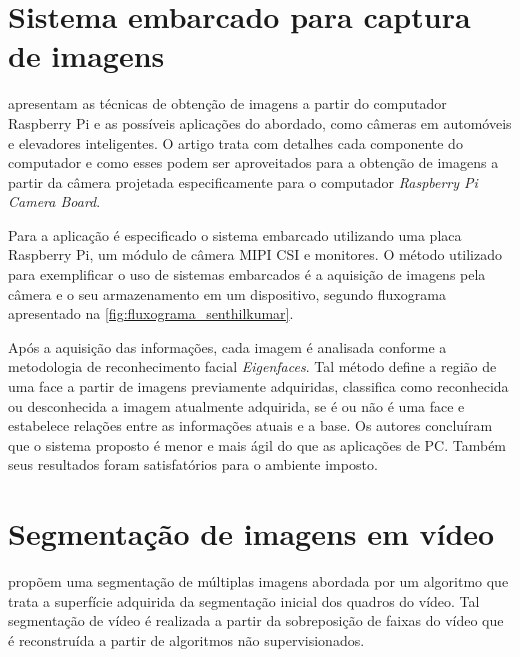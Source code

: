 \documentclass[12pt,oneside,a4paper,chapter=TITLE,section=TITLE,sumario=tradicional]{abntex2}
\begin{document}
\begin{figure}[htb]
\end{figure}

\section{Sistema embarcado para captura de imagens}

 apresentam as técnicas de obtenção de imagens a partir do computador Raspberry Pi e as possíveis aplicações do abordado, como câmeras em automóveis e elevadores inteligentes. O artigo trata com detalhes cada componente do computador e como esses podem ser aproveitados para a obtenção de imagens a partir da câmera projetada especificamente para o computador \textit{Raspberry Pi Camera Board}.

Para a aplicação é especificado o sistema embarcado utilizando uma placa Raspberry Pi, um módulo de câmera MIPI CSI e monitores. O método utilizado para exemplificar o uso de sistemas embarcados é a aquisição de imagens pela câmera e o seu armazenamento em um dispositivo, segundo fluxograma apresentado na \autoref{fig:fluxograma_senthilkumar}.

\begin{figure}[htb]
\end{figure}

Após a aquisição das informações, cada imagem é analisada conforme a metodologia de reconhecimento facial \textit{Eigenfaces}. Tal método define a região de uma face a partir de imagens previamente adquiridas, classifica como reconhecida ou desconhecida a imagem atualmente adquirida, se é ou não é uma face e estabelece relações entre as informações atuais e a base.
Os autores concluíram que o sistema proposto é menor e mais ágil do que as aplicações de PC. Também seus resultados foram satisfatórios para o ambiente imposto.

\section{Segmentação de imagens em vídeo}

 propõem uma segmentação de múltiplas imagens abordada por um algoritmo que trata a superfície adquirida da segmentação inicial dos quadros do vídeo. Tal segmentação de vídeo é realizada a partir da sobreposição de faixas do vídeo que é reconstruída a partir de algoritmos não supervisionados.
\end{document}
